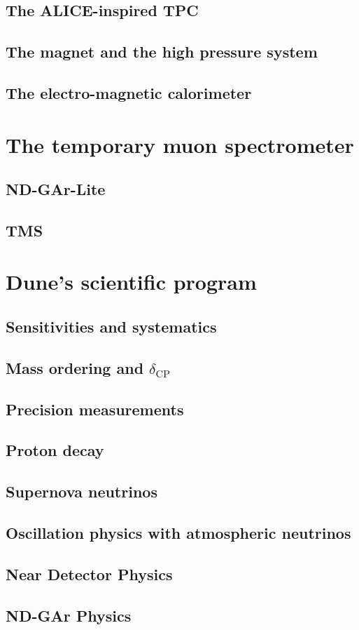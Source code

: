 \subsection{The ALICE-inspired TPC}
\subsection{The magnet and the high pressure system}
\subsection{The electro-magnetic calorimeter}
\section{The temporary muon spectrometer}
\subsection{ND-GAr-Lite}
\subsection{TMS}
\section{Dune's scientific program}
\subsection{Sensitivities and systematics}
\subsection{Mass ordering and $\delta_\textrm{CP}$}
\subsection{Precision measurements}
\subsection{Proton decay}
\subsection{Supernova neutrinos}
\subsection{Oscillation physics with atmospheric neutrinos}
\subsection{Near Detector Physics}
\subsection{ND-GAr Physics}
